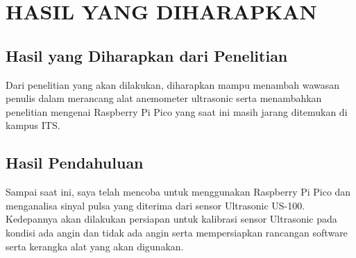 \section{HASIL YANG DIHARAPKAN}

\subsection{Hasil yang Diharapkan dari Penelitian}

Dari penelitian yang akan dilakukan, diharapkan mampu menambah wawasan penulis dalam merancang alat anemometer ultrasonic serta
menambahkan penelitian mengenai Raspberry Pi Pico yang saat ini masih jarang ditemukan di kampus ITS.

\subsection{Hasil Pendahuluan}

Sampai saat ini, saya telah mencoba untuk menggunakan Raspberry Pi Pico dan menganalisa
sinyal pulsa yang diterima dari sensor Ultrasonic US-100. Kedepannya akan dilakukan persiapan
untuk kalibrasi sensor Ultrasonic pada kondisi ada angin dan tidak ada angin serta mempersiapkan
rancangan software serta kerangka alat yang akan digunakan.
